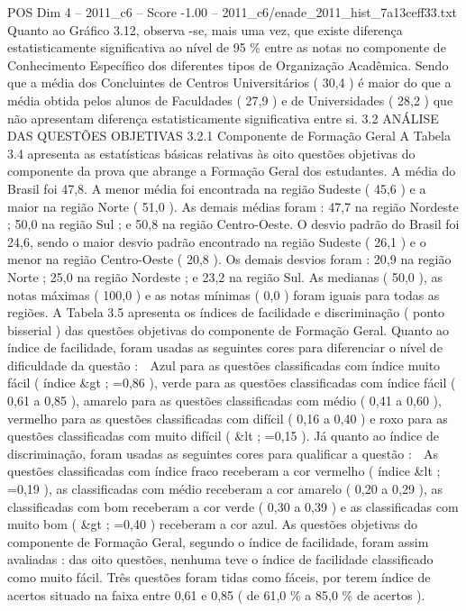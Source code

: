 \begin{textsample}{POS Dim 4 – 2011\_c6 – Score -1.00 – 2011\_c6/enade\_2011\_hist\_7a13ceff33.txt}
Quanto ao Gráfico 3.12, observa -se, mais uma vez, que existe diferença estatisticamente significativa ao nível de 95 \% entre as notas no componente de Conhecimento Específico dos diferentes tipos de Organização Acadêmica.
Sendo que a média dos Concluintes de Centros Universitários ( 30,4 ) é maior do que a média obtida pelos alunos de Faculdades ( 27,9 ) e de Universidades ( 28,2 ) que não apresentam diferença estatisticamente significativa entre si. 3.2 ANÁLISE DAS QUESTÕES OBJETIVAS 3.2.1 Componente de Formação Geral A Tabela 3.4 apresenta as estatísticas básicas relativas às oito questões objetivas do componente da prova que abrange a Formação Geral dos estudantes.
A média do Brasil foi 47,8.
A menor média foi encontrada na região Sudeste ( 45,6 ) e a maior na região Norte ( 51,0 ).
As demais médias foram : 47,7 na região Nordeste ; 50,0 na região Sul ; e 50,8 na região Centro-Oeste.
O desvio padrão do Brasil foi 24,6, sendo o maior desvio padrão encontrado na região Sudeste ( 26,1 ) e o menor na região Centro-Oeste ( 20,8 ).
Os demais desvios foram : 20,9 na região Norte ; 25,0 na região Nordeste ; e 23,2 na região Sul.
As medianas ( 50,0 ), as notas máximas ( 100,0 ) e as notas mínimas ( 0,0 ) foram iguais para todas as regiões.
A Tabela 3.5 apresenta os índices de facilidade e discriminação ( ponto bisserial ) das questões objetivas do componente de Formação Geral.
Quanto ao índice de facilidade, foram usadas as seguintes cores para diferenciar o nível de dificuldade da questão :  Azul para as questões classificadas com índice muito fácil ( índice \&gt ; =0,86 ), verde para as questões classificadas com índice fácil ( 0,61 a 0,85 ), amarelo para as questões classificadas com médio ( 0,41 a 0,60 ), vermelho para as questões classificadas com difícil ( 0,16 a 0,40 ) e roxo para as questões classificadas com muito difícil ( \&lt ; =0,15 ).
Já quanto ao índice de discriminação, foram usadas as seguintes cores para qualificar a questão :  As questões classificadas com índice fraco receberam a cor vermelho ( índice \&lt ; =0,19 ), as classificadas com médio receberam a cor amarelo ( 0,20 a 0,29 ), as classificadas com bom receberam a cor verde ( 0,30 a 0,39 ) e as classificadas com muito bom ( \&gt ; =0,40 ) receberam a cor azul.
As questões objetivas do componente de Formação Geral, segundo o índice de facilidade, foram assim avaliadas : das oito questões, nenhuma teve o índice de facilidade classificado como muito fácil.
Três questões foram tidas como fáceis, por terem índice de acertos situado na faixa entre 0,61 e 0,85 ( de 61,0 \% a 85,0 \% de acertos ).

\end{textsample}
